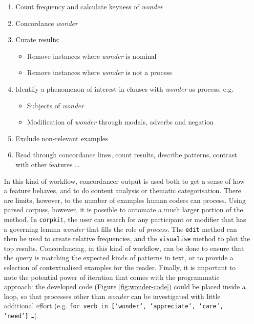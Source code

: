 \begin{enumerate}[noitemsep,topsep=0pt]
\item Count frequency and calculate keyness of \emph{wonder}
\item Concordance \emph{wonder}
\item Curate results:
\begin{itemize}[noitemsep,topsep=0pt]
\item Remove instances where \emph{wonder} is nominal
\item Remove instances where \emph{wonder} is not a process
\end{itemize}
\item Identify a phenomenon of interest in clauses with \emph{wonder} as process, e.g.
\begin{itemize}[noitemsep,topsep=0pt]
\item Subjects of \emph{wonder}
\item Modification of \emph{wonder} through modals, adverbs and negation
\end{itemize}
\item Exclude non\hyp{}relevant examples
\item Read through concordance lines, count results, describe patterns, contrast with other features \ldots
\end{enumerate}
%
In this kind of workflow, concordancer output is used both to get a sense of how a  feature behaves, and to do content analysis or thematic categorisation. There are limits, however, to the number of examples human coders can process. Using parsed \glspl{corpus}, however, it is possible to automate a much larger portion of the method. In \texttt{corpkit}, the user can search for any participant or modifier that has a governing lemma \emph{wonder} that fills the role of \emph{process}. The \texttt{edit} method can then be used to create relative frequencies, and the \texttt{visualise} method to plot the top results. Concordancing, in this kind of workflow, can be done to ensure that the query is matching the expected kinds of patterns in text, or to provide a selection of contextualised examples for the reader. Finally, it is important to note the potential power of iteration that comes with the programmatic approach: the developed code (Figure \ref{fig:wonder-code}) could be placed inside a loop, so that processes other than \emph{wonder} can be investigated with little additional effort (e.g. \texttt{for verb in ['wonder', 'appreciate', 'care', 'need']} \texttt{\dots}).

